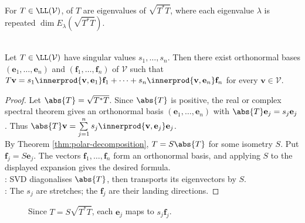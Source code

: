 \begin{definition} \label{def:singular-values} \\
For $T\in\LL(\mathcal{V})$,  of $T$ are eigenvalues of $\sqrt{T^*T}$, where each eigenvalue $\lambda$ is repeated $\dim E_{\lambda}(\sqrt{T^*T})$.
\end{definition}

\begin{theorem} \label{thm:singular-value-decomposition} \\
Let $T\in\LL(\mathcal{V})$ have singular values $s_1,\ldots,s_n$. Then there exist orthonormal bases $(\mathbf{e}_1,\ldots,\mathbf{e}_n)$ and $(\mathbf{f}_1,\ldots,\mathbf{f}_n)$ of $\mathcal{V}$ such that $T\mathbf{v}=s_1\innerprod{\mathbf{v},\mathbf{e}_1}\mathbf{f}_1+\cdots+s_n\innerprod{\mathbf{v},\mathbf{e}_n}\mathbf{f}_n$ for every $\mathbf{v}\in\mathcal{V}$.
\begin{proof}
Let $\abs{T}=\sqrt{T^*T}$. Since $\abs{T}$ is positive, the real or complex spectral theorem gives an orthonormal basis $(\mathbf{e}_1,\ldots,\mathbf{e}_n)$ with $\abs{T}\mathbf{e}_j=s_j\mathbf{e}_j$. Thus $\abs{T}\mathbf{v}=\sum\limits_{j=1}^{n}s_j\innerprod{\mathbf{v},\mathbf{e}_j}\mathbf{e}_j$.\\
By Theorem \ref{thm:polar-decomposition}, $T=S\abs{T}$ for some isometry $S$. Put $\mathbf{f}_j=S\mathbf{e}_j$. The vectors $\mathbf{f}_1,\ldots,\mathbf{f}_n$ form an orthonormal basis, and applying $S$ to the displayed expansion gives the desired formula.\\
: SVD diagonalises $\abs{T}$, then transports its eigenvectors by $S$.\\
: The $s_j$ are stretches; the $\mathbf{f}_j$ are their landing directions.
\end{proof}
\end{theorem}

\begin{figure}[H]
  \centering
  
  \caption{Since $T=S\sqrt{T^*T}$, each $\mathbf{e}_j$ maps to $s_j\mathbf{f}_j$.}
  \label{fig:singular-value-decomposition}
\end{figure}

